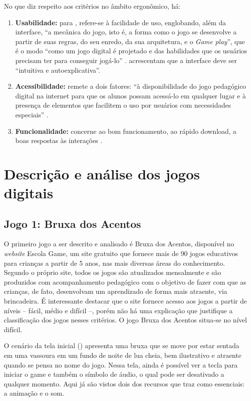 \documentclass{textolivre}
\begin{document}
No que diz respeito aos critérios no âmbito ergonômico, há:

\begin{enumerate}
    \item \textbf{Usabilidade:} para \textcite{ribeiro2013}, refere-se à facilidade de uso, englobando, além da interface, “a mecânica do jogo, isto é, a forma como o jogo se desenvolve a partir de suas regras, do seu enredo, da sua arquitetura, e o \emph{Game play}”, que é o modo “como um jogo digital é projetado e das habilidades que os usuários precisam ter para conseguir jogá-lo” \cite[p. 81]{ribeiro2013}. \textcite[p. 4]{ribeiro2009} acrescentam que a interface deve ser “intuitiva e autoexplicativa”.
    \item \textbf{Acessibilidade:} remete a dois fatores: “à disponibilidade do jogo pedagógico digital na internet para que os alunos possam acessá-lo em qualquer lugar e à presença de elementos que facilitem o uso por usuários com necessidades especiais” \cite[p. 82]{ribeiro2013}.
    \item \textbf{Funcionalidade:} concerne ao bom funcionamento, ao rápido download, a boas respostas às interações \cite{ribeiro2009}.
\end{enumerate} 

\section{Descrição e análise dos jogos digitais}\label{sec-5}
\subsection{Jogo 1: Bruxa dos Acentos}
O primeiro jogo a ser descrito e analisado é Bruxa dos Acentos, disponível no \emph{website} Escola Game, um site gratuito que fornece mais de 90 jogos educativos para crianças a partir de 5 anos, nas mais diversas áreas do conhecimento. Segundo o próprio site, todos os jogos são atualizados mensalmente e são produzidos com acompanhamento pedagógico com o objetivo de fazer com que as crianças, de fato, desenvolvam um aprendizado de forma mais atraente, via brincadeira. É interessante destacar que o site fornece acesso aos jogos a partir de níveis – fácil, médio e difícil –, porém não há uma explicação que justifique a classificação dos jogos nesses critérios. O jogo Bruxa dos Acentos situa-se no nível difícil.

O cenário da tela inicial () apresenta uma bruxa que se move por estar sentada em uma vassoura em um fundo de noite de lua cheia, bem ilustrativo e atraente quando se pensa no nome do jogo. Nessa tela, ainda é possível ver a tecla para iniciar o game e também o símbolo de áudio, o qual pode ser desativado a qualquer momento. Aqui já são vistos dois dos recursos que \textcite{ribeiro2013} traz como essenciais: a animação e o som.
\end{document}
